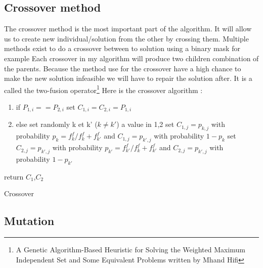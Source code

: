 \documentclass[12pt]{article}
\begin{document}
	\subsection{Crossover method}
	The crossover method is the most important part of the algorithm. It will allow us to create new individual/solution from the other by crossing them. Multiple methods exist to do a crossover between to solution using a binary mask for example
	Each crossover in my algorithm will produce two children combination of the parents. Because the method use for the crossover have a high chance to make the new solution infeasible we will have to repair the solution after.
	It is a called the two-fusion operator\footnote{A Genetic Algorithm-Based Heuristic for Solving the Weighted
		Maximum Independent Set and Some Equivalent Problems written by Mhand
		Hifi}
	Here is the crossover algorithm :
	\begin{enumerate}
		\item if  $P_{1,i} == P_{2,i}$
		\subitem set $C_{1,i} = C_{2,i} = P_{1,i} $
		\item else
		\subitem set randomly  k et k' ($k \neq k'$) a value in {1,2}
		\subitem set $ C_{1,j} = p _{k,j} $ with probability $p_k = f_k^f / f_k^f+f_{k'}^f$
		\subsubitem and $ C_{1,j} = p _{k',j} $ with probability $1-p_k$
		\subitem set $ C_{2,j} = p _{k',j} $ with probability $p_{k'} = f_{k'}^f / f_k^f+f_{k'}^f$
		\subsubitem and $ C_{2,j} = p _{k',j} $ with probability $1-p_{k'}$
	\end{enumerate}
	\begin{algorithm}
		return	$C_1$,$C_2$
		\caption{Crossover}
	\end{algorithm}
	\pagebreak
	\subsection{Mutation}
\end{document}

